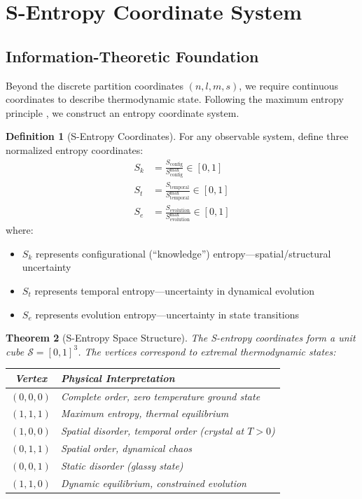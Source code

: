 \documentclass[twocolumn,10pt,a4paper]{article}
\newtheorem{theorem}{Theorem}[section]
\theoremstyle{definition}
\newtheorem{definition}[theorem]{Definition}
\theoremstyle{remark}
\newcommand{\Sk}{S_k}
\newcommand{\St}{S_t}
\newcommand{\Se}{S_e}
\begin{document}
\section{S-Entropy Coordinate System}
\label{sec:sentropy}

\subsection{Information-Theoretic Foundation}

Beyond the discrete partition coordinates $(n, l, m, s)$, we require continuous coordinates to describe thermodynamic state. Following the maximum entropy principle \cite{jaynes1957}, we construct an entropy coordinate system.

\begin{definition}[S-Entropy Coordinates]
\label{def:sentropy}
For any observable system, define three normalized entropy coordinates:
\begin{align}
    \Sk &= \frac{S_{\text{config}}}{S_{\text{config}}^{\max}} \in [0,1] \\
    \St &= \frac{S_{\text{temporal}}}{S_{\text{temporal}}^{\max}} \in [0,1] \\
    \Se &= \frac{S_{\text{evolution}}}{S_{\text{evolution}}^{\max}} \in [0,1]
\end{align}
where:
\begin{itemize}
    \item $\Sk$ represents configurational (``knowledge'') entropy---spatial/structural uncertainty
    \item $\St$ represents temporal entropy---uncertainty in dynamical evolution
    \item $\Se$ represents evolution entropy---uncertainty in state transitions
\end{itemize}
\end{definition}

\begin{theorem}[S-Entropy Space Structure]
The S-entropy coordinates form a unit cube $\mathcal{S} = [0,1]^3$. The vertices correspond to extremal thermodynamic states:
\begin{center}
\begin{tabular}{cl}
\toprule
Vertex & Physical Interpretation \\
\midrule
$(0,0,0)$ & Complete order, zero temperature ground state \\
$(1,1,1)$ & Maximum entropy, thermal equilibrium \\
$(1,0,0)$ & Spatial disorder, temporal order (crystal at $T > 0$) \\
$(0,1,1)$ & Spatial order, dynamical chaos \\
$(0,0,1)$ & Static disorder (glassy state) \\
$(1,1,0)$ & Dynamic equilibrium, constrained evolution \\
\bottomrule
\end{tabular}
\end{center}
\end{theorem}
\end{document}
